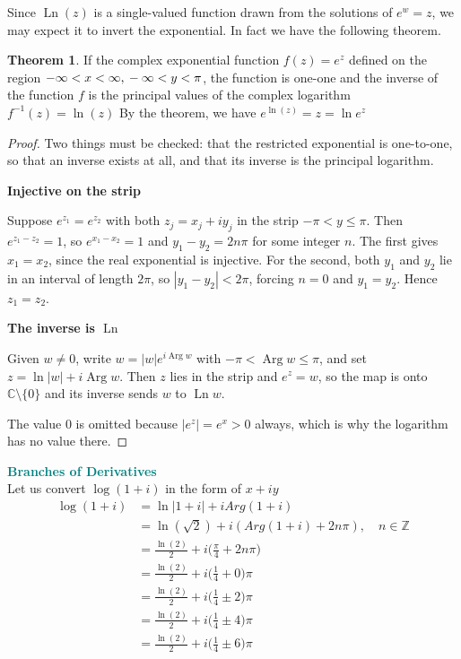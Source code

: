 \documentclass[11pt,a4paper]{article}
\theoremstyle{definition}
\newtheorem{thm}{Theorem}[section]
\newcommand{\subhead}[1]{%
  \par\medskip\noindent\textbf{#1}\par\nobreak\smallskip}
\begin{document}
Since $\operatorname{Ln}(z)$ is a single-valued function drawn from the
solutions of $e^w = z$, we may expect it to invert the exponential. In fact we
have the following theorem.

\begin{thm}
If the complex exponential function $f(z ) =  e^z$ defined on the region $-\infty  < x < \infty, \,\\ -\infty < y < \pi$, the function is one-one and the inverse of the function $f$ is the principal values of the complex logarithm $\boxed{f^{-1}(z) = \ln (z)}$ By the theorem, we have
$\boxed{e^{\ln (z)} = z = \ln e^z}$
\end{thm}

\begin{proof}
Two things must be checked: that the restricted exponential is one-to-one, so
that an inverse exists at all, and that its inverse is the principal logarithm.

\subhead{Injective on the strip}
Suppose $e^{z_1}=e^{z_2}$ with both $z_j=x_j+iy_j$ in the strip
$-\pi<y\leq\pi$. Then $e^{z_1-z_2}=1$, so $e^{x_1-x_2}=1$ and
$y_1-y_2=2n\pi$ for some integer $n$. The first gives $x_1=x_2$, since the real
exponential is injective. For the second, both $y_1$ and $y_2$ lie in an
interval of length $2\pi$, so $\left|y_1-y_2\right|<2\pi$, forcing $n=0$ and
$y_1=y_2$. Hence $z_1=z_2$.

\subhead{The inverse is $\operatorname{Ln}$}
Given $w\neq 0$, write $w=\left|w\right|e^{i\operatorname{Arg}w}$ with
$-\pi<\operatorname{Arg}w\leq\pi$, and set
$z=\ln\left|w\right|+i\operatorname{Arg}w$. Then $z$ lies in the strip and
$e^{z}=w$, so the map is onto $\mathbb{C}\setminus\{0\}$ and its inverse sends
$w$ to $\operatorname{Ln}w$.

The value $0$ is omitted because $\left|e^{z}\right|=e^{x}>0$ always, which is
why the logarithm has no value there.
\end{proof}

\textbf{\textcolor{teal}{Branches of Derivatives}}\\
Let us convert $\log(1 + i)$ in the form of $x + iy$
\begin{align*}
\log( 1 + i) & = \ln\left|1 + i\right| + i Arg(1  + i)\\
& = \ln (\sqrt{2}) + i ( Arg(1+ i) + 2n\pi),\quad  n\in \mathbb{Z}\\
& = \frac{\ln (2)}{2} + i \Big(\frac{\pi}{4} + 2n\pi\Big)\\
& = \frac{\ln (2)}{2} + i \Big(\frac{1}{4} + 0\Big)\pi\\
& = \frac{\ln (2)}{2} + i \Big(\frac{1}{4} \pm 2\Big)\pi\\
& = \frac{\ln (2)}{2} + i \Big(\frac{1}{4} \pm 4\Big)\pi\\
& = \frac{\ln (2)}{2} + i \Big(\frac{1}{4} \pm 6\Big)\pi\\
\end{align*}
\end{document}
